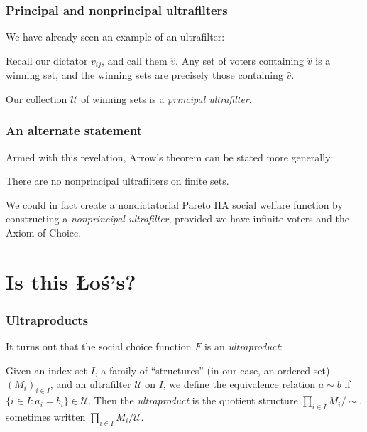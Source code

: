 \documentclass{beamer}
\theoremstyle{definition}
\begin{document}
\begin{frame}
    \frametitle{Principal and nonprincipal ultrafilters}

    We have already seen an example of an ultrafilter:

    \pause
    Recall our dictator $v_{ij}$, and call them $\hat{v}$.
    \pause
    Any set of voters containing $\hat{v}$ is a winning set, and the winning sets are precisely those containing $\hat{v}$.
    
    \pause
    Our collection $\mathcal{U}$ of winning sets is a \emph{principal ultrafilter}.

\end{frame}

\begin{frame}
    \frametitle{An alternate statement}

    Armed with this revelation, Arrow's theorem can be stated more generally:

    \pause
    \begin{theorem}
        There are no nonprincipal ultrafilters on finite sets.
    \end{theorem}

    \pause
    We could in fact create a nondictatorial Pareto IIA social welfare function by constructing a \emph{nonprincipal ultrafilter},
    provided we have infinite voters and the Axiom of Choice.

\end{frame}

\section{Is this Łoś's?}

\begin{frame}
    \frametitle{Ultraproducts}

    It turns out that the social choice function $F$ is an \emph{ultraproduct}:

    \pause
    Given an index set $I$, a family of ``structures'' (in our case, an ordered set) $(M_i)_{i \in I}$, and an ultrafilter $\mathcal{U}$ on $I$,
    we define the equivalence relation $a \sim b$ if $\{i \in I : a_i = b_i\} \in \mathcal{U}$. Then the \emph{ultraproduct} is
    the quotient structure $\prod_{i \in I} M_i / \sim$, sometimes written $\prod_{i \in I} M_i / \mathcal{U}$.

\end{frame}
\end{document}
